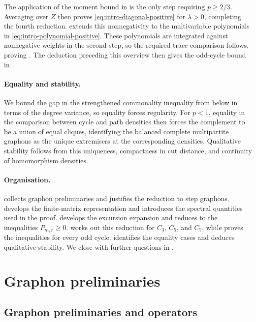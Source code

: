 \documentclass[11pt]{article}
\theoremstyle{remark}
\numberwithin{equation}{section}
\begin{document}
The application of the moment bound in  is the only step requiring $p\ge2/3$.
Averaging over $Z$ then proves \eqref{eq:intro-diagonal-positive} for $\lambda>0$, completing the fourth reduction.
 extends this nonnegativity to the multivariable polynomials in \eqref{eq:intro-polynomial-positive}.
These polynomials are integrated against nonnegative weights in the second step, so the required trace comparison follows, proving .
The deduction preceding this overview then gives the odd-cycle bound in .

\paragraph{Equality and stability.}
We bound the gap in the strengthened commonality inequality from below in terms of the degree variance, so equality forces regularity.
For $p<1$, equality in the comparison between cycle and path densities then forces the complement to be a union of equal cliques, identifying the balanced complete multipartite graphons as the unique extremisers at the corresponding densities.
Qualitative stability follows from this uniqueness, compactness in cut distance, and continuity of homomorphism densities.

\paragraph{Organisation.}
 collects graphon preliminaries and justifies the reduction to step graphons.
 develops the finite-matrix representation and introduces the spectral quantities used in the proof.
 develops the excursion expansion and reduces  to the inequalities $P_{m,r}\ge0$.
 works out this reduction for $C_3$, $C_5$, and $C_7$, while  proves the inequalities for every odd cycle.
 identifies the equality cases and deduces qualitative stability.
We close with further questions in .

\section{Graphon preliminaries}
\label{sec:preliminaries}

\subsection{Graphon preliminaries and operators}
\label{subsec:graphon-preliminaries}
\end{document}
